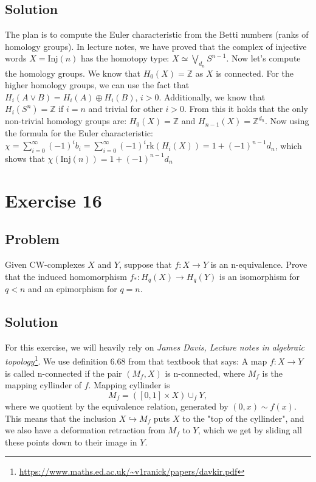 \documentclass{article}
\begin{document}
\subsection*{Solution}
The plan is to compute the Euler characteristic from the Betti numbers (ranks of homology groups).
In lecture notes, we have proved that the complex of injective words
$X = \mathrm{Inj}(n)$ has the homotopy type:
$X \simeq \bigvee_{d_n} S^{n-1}$.
Now let's compute the homology groups.
We know that $H_0(X) = \mathbb{Z}$ as $X$ is connected.
For the higher homology groups, we can use the fact that
$H_i (A \vee B) = H_i(A) \oplus H_i(B)$, $i>0$. Additionally, we know that $H_i (S^n) = \mathbb{Z}$ if $i=n$ and trivial for other $i>0$.
From this it holds that the only non-trivial homology groups are:
$H_0(X) = \mathbb{Z}$ and $H_{n-1}(X) = \mathbb{Z}^{d_n}$.
Now using the formula for the Euler characteristic:
$\chi = \sum_{i=0}^\infty (-1)^i b_i = \sum_{i=0}^\infty (-1)^i \mathrm{rk}(H_i(X)) = 1 + (-1)^{n-1} d_n$,
which shows that $\chi(\mathrm{Inj}(n)) = 1+(-1)^{n-1} d_n$
\newpage
\section*{Exercise 16}
\subsection*{Problem}
Given CW-complexes $X$ and $Y$, suppose that $f: X \to Y$ is an
n-equivalence. Prove that the induced homomorphism $f_*: H_q(X) \to H_q(Y)$ is an isomorphism for $q < n$ and an epimorphism for $q=n$.
\subsection*{Solution}
For this exercise, we will heavily rely on \textit{James Davis, Lecture notes in algebraic topology}\footnote{\url{https://www.maths.ed.ac.uk/~v1ranick/papers/davkir.pdf}}. We use definition 6.68 from that textbook that says:
A map $f: X \to Y$ is called n-connected if the pair $(M_f, X)$ is n-connected, where $M_f$ is the mapping cyllinder of $f$.
Mapping cyllinder is 
\begin{equation*}
M_f = ([0,1] \times X) \cup_f Y,
\end{equation*}
where we quotient by the equivalence relation, generated by $(0,x) \sim f(x)$.
This means that the inclusion $X \hookrightarrow M_f$ puts $X$ to the "{}top of the cyllinder"{}, and we also have a deformation retraction from $M_f$ to $Y$, which we get by sliding all these points down to their image in $Y$.
\end{document}
